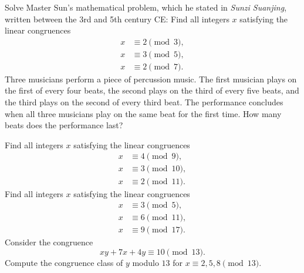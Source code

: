 \begin{starter}
  \exercise Solve Master Sun's mathematical problem, which he stated in \emph{Sunzi Suanjing}, written between the 3rd and 5th century CE: Find all integers $x$ satisfying the linear congruences
  \begin{align*}
    x & \equiv 2 \pmod{3},\\
    x & \equiv 3 \pmod{5},\\
    x & \equiv 2 \pmod{7}.
  \end{align*}
  \exercise Three musicians perform a piece of percussion music. The first musician plays on the first of every four beats, the second plays on the third of every five beats, and the third plays on the second of every third beat. The performance concludes when all three musicians play on the same beat for the first time. How many beats does the performance last?
\end{starter}

\begin{routine}
  \exercise Find all integers $x$ satisfying the linear congruences
  \begin{align*}
    x & \equiv 4 \pmod{9},\\
    x & \equiv 3 \pmod{10},\\
    x & \equiv 2 \pmod{11}.
  \end{align*}
  \exercise Find all integers $x$ satisfying the linear congruences
  \begin{align*}
    x & \equiv 3 \pmod{5}, \\
    x & \equiv 6 \pmod{11}, \\
    x & \equiv 9 \pmod{17}.
  \end{align*}
  \exercise Consider the congruence
  \begin{equation*}
    xy + 7x + 4y \equiv 10\pmod{13}.
  \end{equation*}
  Compute the congruence class of $y$ modulo $13$ for $x\equiv 2,5,8\pmod{13}$.
\end{routine}

